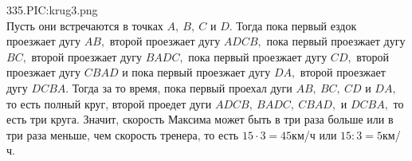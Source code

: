 335.{{PIC:krug3.png}}\\
Пусть они встречаются в точках $A,\ B,\ C$ и $D.$ Тогда пока первый ездок проезжает дугу $AB,$ второй проезжает дугу $ADCB,$ пока первый проезжает дугу $BC,$ второй проезжает дугу $BADC,$ пока первый проезжает дугу $CD,$ второй проезжает дугу $CBAD$ и пока первый проезжает дугу $DA,$ второй проезжает дугу $DCBA.$ Тогда за то время, пока первый проехал дуги $AB,\ BC,\ CD$ и $DA,$ то есть полный круг, второй проедет дуги $ADCB,\ BADC,\ CBAD,$ и $DCBA,$ то есть три круга. Значит, скорость Максима может быть в три раза больше или в три раза меньше, чем скорость тренера, то есть $15\cdot3=45$км/ч или $15:3=5$км/ч.\\
